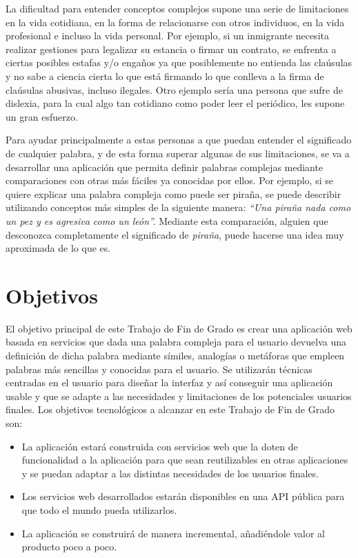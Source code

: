 La dificultad para entender conceptos complejos supone una serie de limitaciones en la vida cotidiana, en la forma de relacionarse con otros individuos, en la vida profesional e incluso la vida personal. Por ejemplo, si un inmigrante necesita realizar gestiones para legalizar su estancia o firmar un contrato, se enfrenta a ciertas posibles estafas y/o engaños ya que posiblemente no entienda las claúsulas y no sabe a ciencia cierta lo que está firmando lo que conlleva a la firma de claúsulas abusivas, incluso ilegales. Otro ejemplo sería una persona que sufre de dislexia, para la cual algo tan cotidiano como poder leer el periódico, les supone un gran esfuerzo.


Para ayudar principalmente a estas personas a que puedan entender el significado de cualquier palabra, y de esta forma superar algunas de sus limitaciones, se va a desarrollar una aplicación que permita definir palabras complejas mediante comparaciones con otras más fáciles ya conocidas por ellos. Por ejemplo, si se quiere explicar una palabra compleja como puede ser piraña, se puede describir utilizando conceptos más simples de la siguiente manera:\textit{ ``Una piraña nada como un pez y es agresiva como un león''.} Mediante esta comparación, alguien que desconozca completamente el significado de \textit{piraña}, puede hacerse una idea muy aproximada de lo que es.


\section{Objetivos}
\label{cap:sec:objetivos}

El objetivo principal de este Trabajo de Fin de Grado es crear una aplicación web basada en servicios que dada una palabra compleja para el usuario devuelva una definición  de dicha palabra mediante símiles, analogías o metáforas que empleen palabras más sencillas y conocidas para el usuario. 
Se utilizarán técnicas centradas en el usuario para diseñar la interfaz y así conseguir una aplicación usable y que se adapte a las necesidades y limitaciones de los potenciales usuarios finales.
Los objetivos tecnológicos a alcanzar en este Trabajo de Fin de Grado son:
\begin{itemize}
	\item La aplicación estará construida con servicios web que la doten de funcionalidad a la aplicación para que sean reutilizables en otras aplicaciones y se puedan adaptar a las distintas necesidades de los usuarios finales.
	\item Los servicios web desarrollados estarán disponibles en una API pública para que todo el mundo pueda utilizarlos.	
	\item La aplicación se construirá de manera incremental, añadiéndole valor al producto poco a poco.	
	
\end{itemize}


